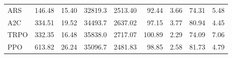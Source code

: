 \begin{samepage}
\begin{center}
\begin{tabular}{l|rr|rr|rr|rr}
    ARS          &   146.48 &    15.40 &    32819.3 &    2513.40 &   92.44 &    3.66 &   74.31 &    5.48 \\
    A2C          &   334.51 &    19.52 &    34493.7 &    2637.02 &   97.15 &    3.77 &   80.94 &    4.45 \\
    TRPO         &   332.35 &    16.48 &    35838.0 &    2717.07 &  100.89 &    2.29 &   74.09 &    7.06 \\
    PPO          &   613.82 &    26.24 &    35096.7 &    2481.83 &   98.85 &    2.58 &   81.73 &    4.79 \\
    \bottomrule
  \end{tabular}
\end{center}
\end{samepage}

